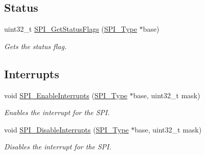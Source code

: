 \subsection*{Status}
\begin{DoxyCompactItemize}
\item 
uint32\+\_\+t \mbox{\hyperlink{group__spi__driver_gaaa5a317a68b409dfe20397b45e48d1f0}{S\+P\+I\+\_\+\+Get\+Status\+Flags}} (\mbox{\hyperlink{struct_s_p_i___type}{S\+P\+I\+\_\+\+Type}} $\ast$base)
\begin{DoxyCompactList}\small\item\em Gets the status flag. \end{DoxyCompactList}\end{DoxyCompactItemize}
\subsection*{Interrupts}
\begin{DoxyCompactItemize}
\item 
void \mbox{\hyperlink{group__spi__driver_gac12d144816080c40ca86d762e31aacc4}{S\+P\+I\+\_\+\+Enable\+Interrupts}} (\mbox{\hyperlink{struct_s_p_i___type}{S\+P\+I\+\_\+\+Type}} $\ast$base, uint32\+\_\+t mask)
\begin{DoxyCompactList}\small\item\em Enables the interrupt for the S\+PI. \end{DoxyCompactList}\item 
void \mbox{\hyperlink{group__spi__driver_ga1c3de83156f45d3f91540a1ec5f92826}{S\+P\+I\+\_\+\+Disable\+Interrupts}} (\mbox{\hyperlink{struct_s_p_i___type}{S\+P\+I\+\_\+\+Type}} $\ast$base, uint32\+\_\+t mask)
\begin{DoxyCompactList}\small\item\em Disables the interrupt for the S\+PI. \end{DoxyCompactList}\end{DoxyCompactItemize}
